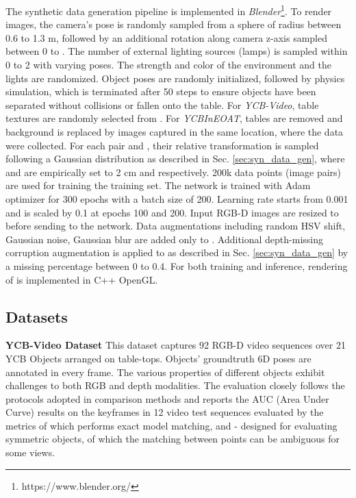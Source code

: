 \documentclass[letterpaper, 10 pt, conference]{ieeeconf}
\begin{document}
The synthetic data generation pipeline is implemented in \textit{Blender}\footnote{https://www.blender.org/}. To render images, the camera's pose is randomly sampled from a sphere of radius between 0.6 to 1.3 m, followed by an additional rotation along camera z-axis sampled between 0 to . The number of external lighting sources (lamps) is sampled within 0 to 2 with varying poses. The strength and color of the environment and the lights are randomized. Object poses are randomly initialized, followed by physics simulation, which is terminated after 50 steps to ensure objects have been separated without collisions or fallen onto the table. For {\it YCB-Video}, table textures are randomly selected from \cite{galerne2010random}. For {\it YCBInEOAT}, tables are removed and background is replaced by images captured in the same location, where the data were collected. For each pair  and , their relative transformation  is sampled following a Gaussian distribution as described in Sec. \ref{sec:syn_data_gen}, where  and  are empirically set to 2 cm and  respectively. 200k data points (image pairs) are used for training the training set. The network is trained with Adam optimizer for 300 epochs with a batch size of 200. Learning rate starts from 0.001 and is scaled by 0.1 at epochs 100 and 200. Input RGB-D images are resized to  before sending to the network. Data augmentations including random HSV shift, Gaussian noise, Gaussian blur are added only to . Additional depth-missing corruption augmentation is applied to  as described in Sec. \ref{sec:syn_data_gen} by a missing percentage between 0 to 0.4. For both training and inference, rendering of  is implemented in C++ OpenGL.


\subsection{Datasets}
\noindent \textbf{YCB-Video Dataset} This dataset \cite{xiang2017posecnn} captures 92 RGB-D video sequences over 21 YCB Objects \cite{calli2015ycb} arranged on table-tops. Objects' groundtruth 6D poses are annotated in every frame. The various properties of different objects exhibit challenges to both RGB and depth modalities. The evaluation closely follows the protocols adopted in comparison methods \cite{xiang2017posecnn, deng2019poserbpf, li2018deepim, wang2019densefusion} and reports the AUC (Area Under Curve) results on the keyframes in 12 video test sequences evaluated by the metrics of  which performs exact model matching, and - \cite{xiang2017posecnn} designed for evaluating symmetric objects, of which the matching between points can be ambiguous for some views.
\end{document}
